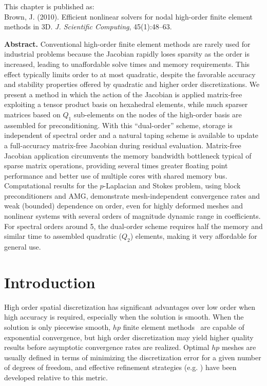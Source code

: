 \textsf{This chapter is published as:\\
  Brown, J. (2010). Efficient nonlinear solvers for nodal high-order finite element methods in 3D. \emph{J. Scientific Computing}, 45(1):48--63.}

\vspace{0.5cm}

\textbf{Abstract.}
  Conventional high-order finite element methods are rarely used for industrial problems because the Jacobian rapidly
  loses sparsity as the order is increased, leading to unaffordable solve times and memory requirements.  This effect
  typically limits order to at most quadratic, despite the favorable accuracy and stability properties offered by
  quadratic and higher order discretizations.  We present a method in which the action of the Jacobian is applied
  matrix-free exploiting a tensor product basis on hexahedral elements, while much sparser matrices based on $Q_1$
  sub-elements on the nodes of the high-order basis are assembled for preconditioning.  With this ``dual-order'' scheme,
  storage is independent of spectral order and a natural taping scheme is available to update a full-accuracy
  matrix-free Jacobian during residual evaluation.  Matrix-free Jacobian application circumvents the memory bandwidth
  bottleneck typical of sparse matrix operations, providing several times greater floating point performance and better
  use of multiple cores with shared memory bus.  Computational results for the $p$-Laplacian and Stokes problem, using
  block preconditioners and AMG, demonstrate mesh-independent convergence rates and weak (bounded) dependence on order,
  even for highly deformed meshes and nonlinear systems with several orders of magnitude dynamic range in coefficients.
  For spectral orders around 5, the dual-order scheme requires half the memory and similar time to assembled quadratic
  ($Q_2$) elements, making it very affordable for general use.

\section{Introduction}
High order spatial discretization has significant advantages over low order when high accuracy is required, especially
when the solution is smooth.  When the solution is only piecewise smooth, $hp$ finite element
methods~\cite{demkowicz1989tuh,oden1989tuh,rachowicz1989tuh,schwab1998pah} are capable of exponential
convergence, but high order discretization may yield higher quality results before asymptotic convergence rates are
realized.  Optimal $hp$ meshes are usually defined in terms of minimizing the discretization error for a given number of
degrees of freedom, and effective refinement strategies (e.g. \cite{ainsworth1998ars,demkowicz2002fah}) have been
developed relative to this metric.

